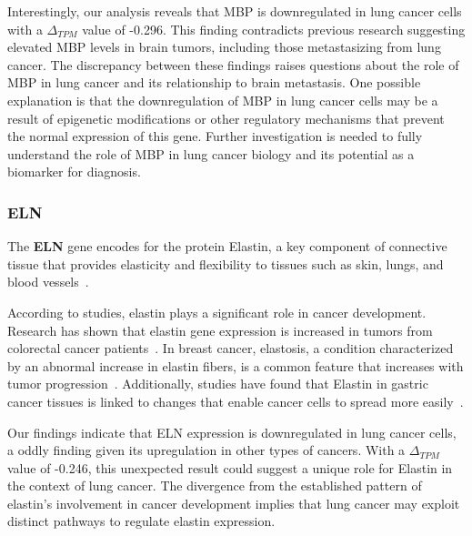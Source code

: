 Interestingly, our analysis reveals that MBP is downregulated in lung cancer cells with a $\Delta_{TPM}$ value of -0.296.
This finding contradicts previous research suggesting elevated MBP levels in brain tumors,
including those metastasizing from lung cancer.
The discrepancy between these findings raises questions about the role of MBP in lung cancer and its relationship to brain metastasis.
One possible explanation is that the downregulation of MBP in lung cancer cells may be a result of epigenetic modifications
or other regulatory mechanisms that prevent the normal expression of this gene.
Further investigation is needed to fully understand the role of MBP in lung cancer biology and its potential as a biomarker for diagnosis.
\newline

\subsubsection*{ELN} \label{subsubsec:eln}
The \textbf{ELN} gene encodes for the protein Elastin,
a key component of connective tissue that provides elasticity and
flexibility to tissues such as skin, lungs, and blood vessels~\cite{Debelle1999ELN}.

According to studies, elastin plays a significant role in cancer development.
Research has shown that elastin gene expression is increased in tumors from colorectal cancer patients~\cite{Li2020ELN}.
In breast cancer, elastosis, a condition characterized by an abnormal increase in elastin fibers,
is a common feature that increases with tumor progression~\cite{Lepucki2022ELN}.
Additionally, studies have found that Elastin in gastric cancer tissues is linked to changes that enable cancer cells
to spread more easily~\cite{Fang2023ELN}.

Our findings indicate that ELN expression is downregulated in lung cancer cells,
a oddly finding given its upregulation in other types of cancers.
With a $\Delta_{TPM}$ value of -0.246, this unexpected result could suggest a unique role for Elastin in the context of lung cancer.
The divergence from the established pattern of elastin's involvement in cancer development implies
that lung cancer may exploit distinct pathways to regulate elastin expression.
\newline

